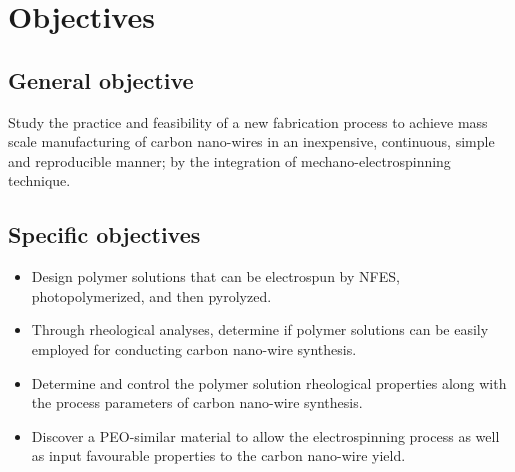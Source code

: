 
\chapter{Objectives} %

\label{Chapter:Objectives}


\section{General objective}
Study the practice and feasibility of a new fabrication process to achieve mass scale manufacturing of carbon nano-wires in an inexpensive, continuous, simple and reproducible manner; by the integration of mechano-electrospinning technique.

\section{Specific objectives}

\begin{itemize}
	\item{
	Design polymer solutions that can be electrospun by NFES, photopolymerized, and then pyrolyzed.
    }
    \item{
    Through rheological analyses, determine if polymer solutions can be easily employed for conducting carbon nano-wire synthesis.
    }
    \item{
    Determine and control the polymer solution rheological properties along with the process parameters of carbon nano-wire synthesis.
    }
    \item{
    Discover a PEO-similar material to allow the electrospinning process as well as input favourable properties to the carbon nano-wire yield.
    }
\end{itemize}




